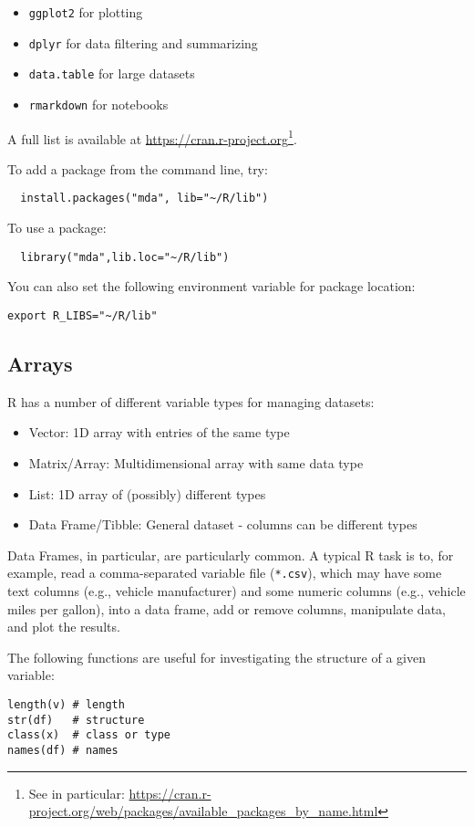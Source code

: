\begin{itemize}
  \item \texttt{ggplot2} for plotting
  \item \texttt{dplyr} for data filtering and summarizing
  \item \texttt{data.table} for large datasets
  \item \texttt{rmarkdown} for notebooks
\end{itemize}

A full list is available at \url{https://cran.r-project.org}\footnote{See in particular: \url{https://cran.r-project.org/web/packages/available_packages_by_name.html}}. 

To add a package from the command line, try: 
\begin{verbatim}
  install.packages("mda", lib="~/R/lib")
\end{verbatim}
To use a package: 
\begin{verbatim}
  library("mda",lib.loc="~/R/lib")
\end{verbatim}

You can also set the following environment variable for package location:
\begin{verbatim}
export R_LIBS="~/R/lib"
\end{verbatim}

\subsection{Arrays}
R has a number of different variable types for managing datasets:
\begin{itemize}
  \item Vector: 1D array with entries of the same type
  \item Matrix/Array: Multidimensional array with same data type
  \item List: 1D array of (possibly) different types
  \item Data Frame/Tibble: General dataset - columns can be different types
\end{itemize}
Data Frames, in particular, are particularly common. A typical R task is to, for example, read a comma-separated variable file (\texttt{*.csv}), which may have some text columns (e.g., vehicle manufacturer) and some numeric columns (e.g., vehicle miles per gallon), into a data frame, add or remove columns, manipulate data, and plot the results.

The following functions are useful for investigating the structure of a given variable:
\begin{verbatim}
length(v) # length
str(df)   # structure
class(x)  # class or type
names(df) # names
\end{verbatim}

